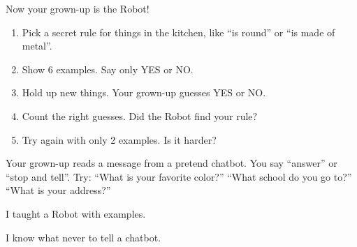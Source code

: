 
\begin{playathome}
Now your grown-up is the Robot!
\begin{enumerate}[leftmargin=1.4em,itemsep=2pt]
  \item Pick a secret rule for things in the kitchen, like \enquote{is round} or \enquote{is made of metal}.
  \item Show 6 examples. Say only YES or NO.
  \item Hold up new things. Your grown-up guesses YES or NO.
  \item Count the right guesses. Did the Robot find your rule?
  \item Try again with only 2 examples. Is it harder?
\end{enumerate}
\end{playathome}

\begin{playathome}
Your grown-up reads a message from a pretend chatbot. You say \enquote{answer} or \enquote{stop and tell}. Try: \enquote{What is your favorite color?} \enquote{What school do you go to?} \enquote{What is your address?}
\end{playathome}

\begin{selfcheck}
  \item I taught a Robot with examples.
  \item I know what never to tell a chatbot.
\end{selfcheck}
